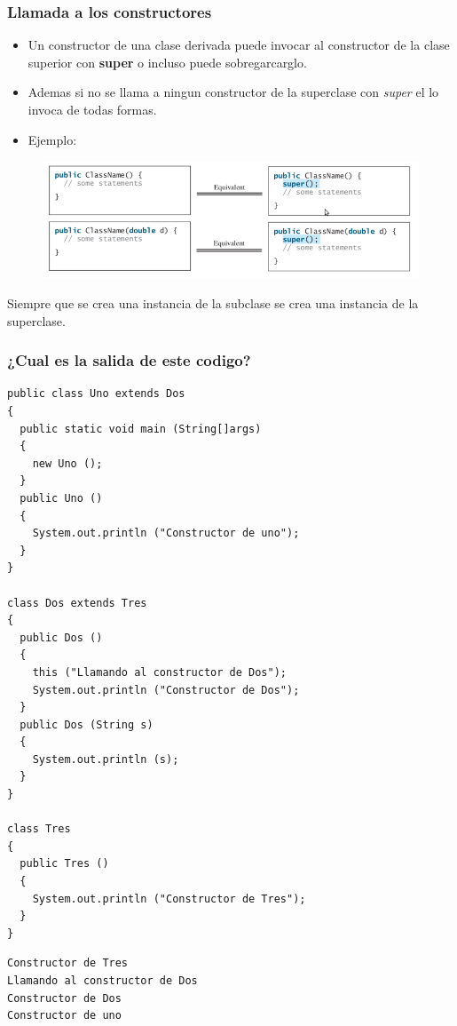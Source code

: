 \documentclass{beamer}
\begin{document}
\begin{frame}[fragile]
    \frametitle{Llamada a los constructores}
  \begin{itemize}[<+->]
\item Un constructor de una clase derivada puede invocar al constructor de la clase superior con \textbf{super} o incluso puede sobregarcarglo.
\item Ademas si no se llama a ningun constructor de la superclase con \emph{super} el lo invoca de todas formas.
\item Ejemplo:
 \end{itemize}
 \pause
 \begin{figure}
 \includegraphics[scale=0.4]{imagenes/constructor.png}
 \end{figure}
 \pause
 Siempre que se crea una instancia de la subclase se crea una instancia de la superclase.
\end{frame}




\begin{frame}[fragile]
    \frametitle{¿Cual es la salida de este codigo?}
    \begin{multicols}{2}
\begin{tiny}
\begin{verbatim}
public class Uno extends Dos
{
  public static void main (String[]args)
  {
    new Uno ();
  }
  public Uno ()
  {
    System.out.println ("Constructor de uno");
  }
}

class Dos extends Tres
{
  public Dos ()
  {
    this ("Llamando al constructor de Dos");
    System.out.println ("Constructor de Dos");
  }
  public Dos (String s)
  {
    System.out.println (s);
  }
}

class Tres
{
  public Tres ()
  {
    System.out.println ("Constructor de Tres");
  }
}
\end{verbatim}
\end{tiny}
\end{multicols}
\pause
\begin{footnotesize}
\begin{verbatim}
Constructor de Tres
Llamando al constructor de Dos
Constructor de Dos
Constructor de uno
\end{verbatim}
\end{footnotesize}
\end{frame}
\end{document}
